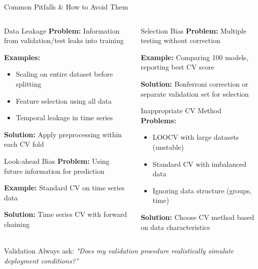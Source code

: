 \documentclass[8pt,aspectratio=1610]{beamer}
\begin{document}
\begin{frame}{Common Pitfalls \& How to Avoid Them}
\begin{columns}[t]
\begin{column}{0.48\textwidth}
\begin{block}{Data Leakage}
\textbf{Problem:} Information from validation/test leaks into training

\textbf{Examples:}
\begin{itemize}
\item Scaling on entire dataset before splitting
\item Feature selection using all data
\item Temporal leakage in time series
\end{itemize}

\textbf{Solution:} Apply preprocessing within each CV fold
\end{block}

\begin{block}{Look-ahead Bias}
\textbf{Problem:} Using future information for prediction

\textbf{Example:} Standard CV on time series data

\textbf{Solution:} Time series CV with forward chaining
\end{block}
\end{column}

\begin{column}{0.48\textwidth}
\begin{block}{Selection Bias}
\textbf{Problem:} Multiple testing without correction

\textbf{Example:} Comparing 100 models, reporting best CV score

\textbf{Solution:} Bonferroni correction or separate validation set for selection
\end{block}

\begin{block}{Inappropriate CV Method}
\textbf{Problems:}
\begin{itemize}
\item LOOCV with large datasets (unstable)
\item Standard CV with imbalanced data
\item Ignoring data structure (groups, time)
\end{itemize}

\textbf{Solution:} Choose CV method based on data characteristics
\end{block}
\end{column}
\end{columns}

\begin{alertblock}{Validation}
Always ask: \textit{"Does my validation procedure realistically simulate deployment conditions?"}
\end{alertblock}
\end{frame}
\end{document}
